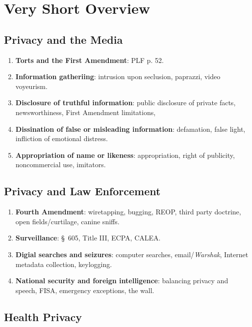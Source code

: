 \section{Very Short Overview}

\subsection{Privacy and the Media}

\begin{enumerate}
    \item \textbf{Torts and the First Amendment}: PLF p. 52.
    \item \textbf{Information gatheriing}: intrusion upon seclusion, paprazzi, 
    video voyeurism.
    \item \textbf{Disclosure of truthful information}: public disclosure of 
    private facts, newsworthiness, First Amendment limitations,
    \item \textbf{Dissination of false or misleading information}: defamation, 
    false light, infliction of emotional distress.
    \item \textbf{Appropriation of name or likeness}: appropriation, right of 
    publicity, noncommercial use, imitators.
\end{enumerate}

\subsection{Privacy and Law Enforcement}

\begin{enumerate}
    \item \textbf{Fourth Amendment}: wiretapping, bugging, REOP, third party 
    doctrine, open fields/curtilage, canine sniffs.
    \item \textbf{Surveillance}: \S\ 605, Title III, ECPA, CALEA.
    \item \textbf{Digial searches and seizures}: computer searches, 
    email/\emph{Warshak}, Internet metadata collection, keylogging.
    \item \textbf{National security and foreign intelligence}: balancing 
    privacy and speech, FISA, emergency exceptions, the wall.
\end{enumerate}

\subsection{Health Privacy}

